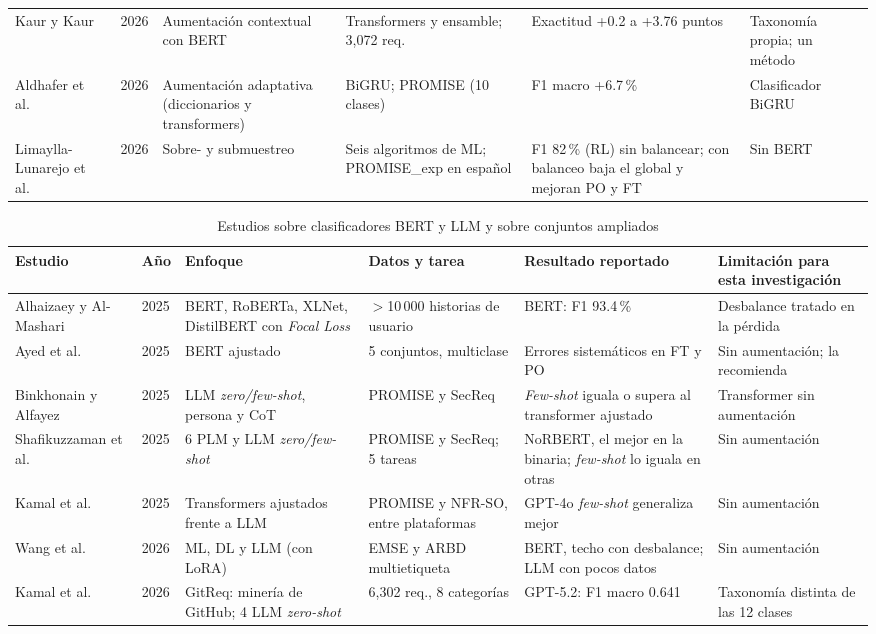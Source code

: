 \documentclass[conference]{IEEEtran}
\begin{document}
\begin{table}[!t]
\begin{tabularx}{\textwidth}{@{}L{2.6cm} L{0.75cm} Y Y Y Y@{}}
Kaur y Kaur~\cite{Kaur2026-Hybrid} & 2026 & Aumentación contextual con BERT & Transformers y ensamble; 3,072 req. & Exactitud +0.2 a +3.76 puntos & Taxonomía propia; un método \\
Aldhafer et al.~\cite{Aldhafer2026-Adaptive} & 2026 & Aumentación adaptativa (diccionarios y transformers) & BiGRU; PROMISE (10 clases) & F1 macro +6.7\,\% & Clasificador BiGRU \\
Limaylla-Lunarejo et al.~\cite{Limaylla2025-Spanish} & 2026 & Sobre- y submuestreo & Seis algoritmos de ML; PROMISE\_exp en español & F1 82\,\% (RL) sin balancear; con balanceo baja el global y mejoran PO y FT & Sin BERT \\
\bottomrule
\end{tabularx}
\end{table}

\begin{table}[!t]
\caption{Estudios sobre clasificadores BERT y LLM y sobre conjuntos ampliados}
\label{tab:matriz-clas}
\centering\footnotesize
\begin{tabularx}{\textwidth}{@{}L{2.6cm} L{0.75cm} Y Y Y Y@{}}
\toprule
\textbf{Estudio} & \textbf{Año} & \textbf{Enfoque} & \textbf{Datos y tarea} & \textbf{Resultado reportado} & \textbf{Limitación para esta investigación} \\
\midrule
Alhaizaey y Al-Mashari~\cite{Alhaizaey2025-AgilePLM} & 2025 & BERT, RoBERTa, XLNet, DistilBERT con \emph{Focal Loss} & $>$10\,000 historias de usuario & BERT: F1 93.4\,\% & Desbalance tratado en la pérdida \\
Ayed et al.~\cite{Ayed2025-Benchmarking} & 2025 & BERT ajustado & 5 conjuntos, multiclase & Errores sistemáticos en FT y PO & Sin aumentación; la recomienda \\
Binkhonain y Alfayez~\cite{Binkhonain2025-Prompts} & 2025 & LLM \emph{zero/few-shot}, persona y CoT & PROMISE y SecReq & \emph{Few-shot} iguala o supera al transformer ajustado & Transformer sin aumentación \\
Shafikuzzaman et al.~\cite{Shafikuzzaman2025-Effectiveness} & 2025 & 6 PLM y LLM \emph{zero/few-shot} & PROMISE y SecReq; 5 tareas & NoRBERT, el mejor en la binaria; \emph{few-shot} lo iguala en otras & Sin aumentación \\
Kamal et al.~\cite{Kamal2025-Robust} & 2025 & Transformers ajustados frente a LLM & PROMISE y NFR-SO, entre plataformas & GPT-4o \emph{few-shot} generaliza mejor & Sin aumentación \\
Wang et al.~\cite{Wang2026-Machine} & 2026 & ML, DL y LLM (con LoRA) & EMSE y ARBD multietiqueta & BERT, techo con desbalance; LLM con pocos datos & Sin aumentación \\
Kamal et al.~\cite{Kamal2026-GitReq} & 2026 & GitReq: minería de GitHub; 4 LLM \emph{zero-shot} & 6,302 req., 8 categorías & GPT-5.2: F1 macro 0.641 & Taxonomía distinta de las 12 clases \\
\bottomrule
\end{tabularx}
\end{table}
\end{document}
